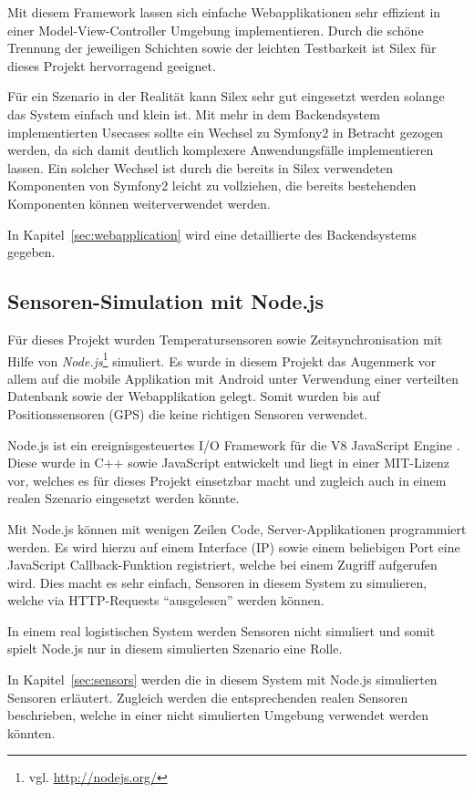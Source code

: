 Mit diesem Framework lassen sich einfache Webapplikationen sehr effizient in einer
	Model-View-Controller Umgebung implementieren. Durch die schöne Trennung der
	jeweiligen Schichten sowie der leichten Testbarkeit ist Silex für dieses
	Projekt hervorragend geeignet.
	
Für ein Szenario in der Realität kann Silex sehr gut eingesetzt werden solange das
	System einfach und klein ist. Mit mehr in dem Backendsystem implementierten
	Usecases sollte ein Wechsel zu Symfony2 in Betracht gezogen werden, da sich
	damit deutlich komplexere Anwendungsfälle implementieren lassen. Ein solcher
	Wechsel ist durch die bereits in Silex verwendeten Komponenten von Symfony2
	leicht zu vollziehen, die bereits bestehenden Komponenten können
	weiterverwendet werden.
	
In Kapitel~\ref{sec:webapplication} wird eine detaillierte des Backendsystems
	gegeben.

\subsection{Sensoren-Simulation mit Node.js}
\label{subsec:nodejs}

Für dieses Projekt wurden Temperatursensoren sowie Zeitsynchronisation mit
	Hilfe von \emph{Node.js}\footnote{vgl. \url{http://nodejs.org/}} simuliert.
	Es wurde in diesem Projekt das Augenmerk vor allem auf die mobile Applikation
	mit Android unter Verwendung einer verteilten Datenbank sowie der
	Webapplikation gelegt. Somit wurden	bis auf	Positionssensoren (GPS) die
	keine richtigen Sensoren verwendet.

Node.js ist ein ereignisgesteuertes I/O Framework für die V8 JavaScript
	Engine \cite{Wikipedia10a}. Diese wurde in C++ sowie JavaScript entwickelt
	und liegt in einer MIT-Lizenz vor, welches es für dieses Projekt einsetzbar
	macht und zugleich auch in einem realen Szenario eingesetzt werden könnte.

Mit Node.js können mit wenigen Zeilen Code, Server-Applikationen programmiert
	werden. Es wird hierzu auf einem Interface (IP) sowie einem beliebigen Port
	eine JavaScript Callback-Funktion registriert, welche bei einem Zugriff
	aufgerufen wird. Dies macht es sehr einfach, Sensoren in diesem System zu
	simulieren, welche via HTTP-Requests ``ausgelesen'' werden können.
	
In einem real logistischen System werden Sensoren nicht simuliert und somit
	spielt Node.js nur in diesem simulierten Szenario eine Rolle.
	
In Kapitel~\ref{sec:sensors} werden die in diesem System mit Node.js simulierten
	Sensoren erläutert. Zugleich werden die entsprechenden realen Sensoren
	beschrieben, welche in einer nicht simulierten Umgebung verwendet werden
	könnten.
